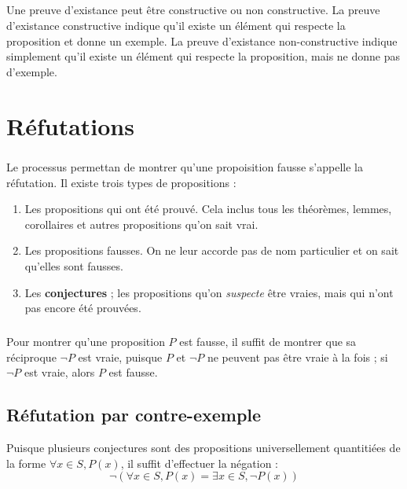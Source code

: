 \documentclass[16pt]{report}
\begin{document}
\begin{multicols*}{2}
        \paragraph{} 
        Une preuve d'existance peut être constructive ou non constructive. La preuve d'existance constructive 
        indique qu'il existe un élément qui respecte la proposition et donne un exemple. La preuve d'existance 
        non-constructive indique simplement qu'il existe un élément qui respecte la proposition, mais ne donne pas 
        d'exemple. 



        \chapter{Réfutations}
        \paragraph{}
        Le processus permettan de montrer qu'une propoisition fausse s'appelle la réfutation. Il existe trois types 
        de propositions :
        \begin{enumerate}
            \item Les propositions qui ont été prouvé. Cela inclus tous les théorèmes, lemmes, corollaires et autres 
                propositions qu'on sait vrai. 
            \item Les propositions fausses. On ne leur accorde pas de nom particulier 
                et on sait qu'elles sont fausses.
            \item Les  \textbf{conjectures} ; les propositions qu'on \textit{suspecte} être vraies, mais qui n'ont 
                pas encore été prouvées. 
        \end{enumerate}



        \paragraph{}
        Pour montrer qu'une proposition $P$ est fausse, il suffit de montrer que sa réciproque $\neg P$ est vraie, 
        puisque $P$ et $\neg P$ ne peuvent pas être vraie à la fois ; si $\neg P$ est vraie, alors $P$ est fausse.

        \section{\textcolor{myp}{\textbf{Réfutation par contre-exemple} }}
        Puisque plusieurs conjectures sont des propositions universellement quantitiées de la forme 
        $\forall x \in S, P(x)$, il suffit d'effectuer la négation : 
        \[ \neg (\forall x \in S, P(x) = \exists x \in S, \neg P(x) ) \]





\end{multicols*}
\end{document}
